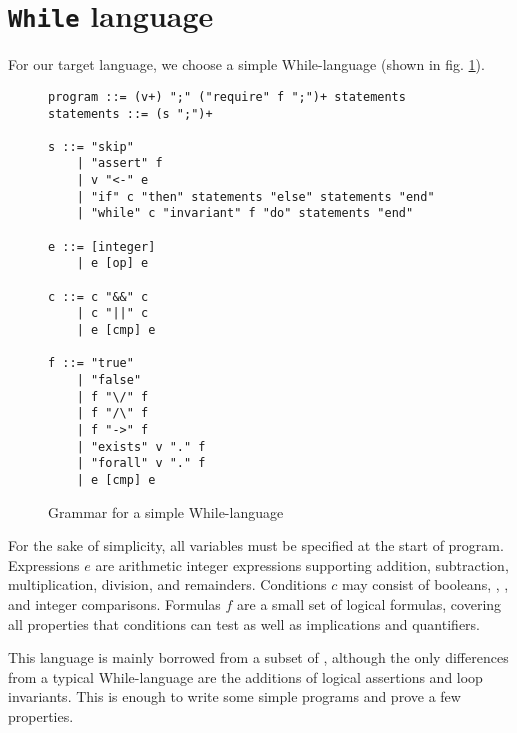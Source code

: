 \section{\texttt{While} language} %

For our target language,
we choose a simple While-language (shown in fig. \ref{fig:whilegrammar}).
\begin{figure}[H]
    \begin{lstlisting}
program ::= (v+) ";" ("require" f ";")+ statements
statements ::= (s ";")+

s ::= "skip"
    | "assert" f
    | v "<-" e
    | "if" c "then" statements "else" statements "end"
    | "while" c "invariant" f "do" statements "end"

e ::= [integer]
    | e [op] e

c ::= c "&&" c
    | c "||" c
    | e [cmp] e

f ::= "true"
    | "false"
    | f "\/" f
    | f "/\" f
    | f "->" f
    | "exists" v "." f
    | "forall" v "." f
    | e [cmp] e \end{lstlisting}
    \caption{Grammar for a simple While-language\label{fig:whilegrammar}}
\end{figure}

For the sake of simplicity,
all variables must be specified at the start of program.
Expressions $e$ are arithmetic integer expressions
supporting addition, subtraction, multiplication, division, and remainders.
Conditions $c$ may consist of booleans, \inl{\&\&}, \inl{||}, and integer comparisons.
Formulas $f$ are a small set of logical formulas, covering all properties that conditions can test
as well as implications and quantifiers.

This language is mainly borrowed from a subset of \cite{jlamp},
although the only differences from a typical While-language
are the additions of logical assertions and loop invariants.
This is enough to write some simple programs and prove a few properties.
